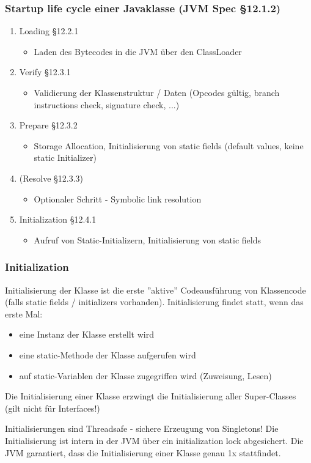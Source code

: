 \documentclass[aspectratio=169]{beamer}
\begin{document}
\begin{frame}
	\frametitle{Startup life cycle einer Javaklasse (JVM Spec §12.1.2)}
	\begin{enumerate}
		\item{Loading §12.2.1}
			\begin{itemize}
				\item{Laden des Bytecodes in die JVM über den ClassLoader}
			\end{itemize}
		\item{Verify §12.3.1}
			\begin{itemize}
				\item{Validierung der Klassenstruktur / Daten (Opcodes gültig, branch instructions check, signature check, ...)}
			\end{itemize}
		\item{Prepare §12.3.2}
			\begin{itemize}
				\item{Storage Allocation, Initialisierung von static fields (default values, keine static Initializer)}
			\end{itemize}
		\item{(Resolve §12.3.3)}
			\begin{itemize}
				\item{Optionaler Schritt - Symbolic link resolution}
			\end{itemize}
		\item{Initialization §12.4.1}
			\begin{itemize}
				\item{Aufruf von Static-Initializern, Initialisierung von static fields}
			\end{itemize}
	\end{enumerate}
\end{frame}

\begin{frame}
	\frametitle{Initialization}
	Initialisierung der Klasse ist die erste ''aktive'' Codeausführung von Klassencode (falls static fields / initializers vorhanden). Initialisierung findet statt, wenn das erste Mal:
	\begin{itemize}
		\item{eine Instanz der Klasse erstellt wird}
		\item{eine static-Methode der Klasse aufgerufen wird}
		\item{auf static-Variablen der Klasse zugegriffen wird (Zuweisung, Lesen)}
	\end{itemize}

	Die Initialisierung einer Klasse erzwingt die Initialisierung aller Super-Classes (gilt nicht für Interfaces!)
	\begin{block}{Initialisierungen sind Threadsafe - sichere Erzeugung von Singletons!}
		Die Initialisierung ist intern in der JVM über ein initialization lock abgesichert. Die JVM garantiert, dass die Initialisierung einer Klasse genau 1x stattfindet. 
	\end{block}
\end{frame}
\end{document}
